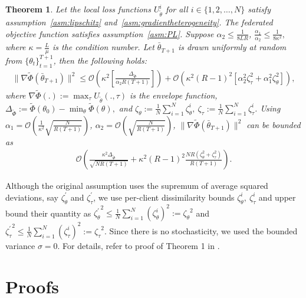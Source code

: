 \documentclass{article}
\let\cite\relax
\newcommand*{\cite}{\citep}
\def\gO{{\mathcal{O}}}
\newtheorem{theorem}{Theorem}%
\theoremstyle{definition}
\begin{document}
\begin{theorem}
    Let the local loss functions $U_{\tilde\theta}^i$ for all $i\in\{1,2,\dots,N\}$ satisfy assumption~\ref{asm:lipschitz} and~\ref{asm:gradientheterogeneity}. The federated objective function satisfies assumption~\ref{asm:PL}. Suppose $\alpha_2\leq \frac{1}{8LR}$, $\frac{\alpha_1}{\alpha_2}\leq\frac{1}{8\kappa^2},$ where $\kappa=\frac{L}{\mu}$ is the condition number. Let $\bar{\theta}_{T+1}$ is drawn uniformly at random from $\{\theta_t\}_{t=1}^{T+1}$, then the following holds:
    \begin{align*}
        \|\nabla\tilde\Phi(\bar\theta_{T+1})\|^2\leq \gO\left(\kappa^2\left[\frac{\Delta_{\tilde\Phi}}{\alpha_2R(T+1)}\right]\right)+\mathcal{O}\left(\kappa^2(R-1)^2[\alpha_2^2\zeta_\tau^2+\alpha_1^2\zeta_{\theta}^2]\right),
    \end{align*}
    where $\nabla\tilde\Phi(.):=\max_{\tau}U_{\tilde\theta}(.,\tau)$ is the envelope function, $\Delta_{\tilde\Phi}:=\tilde\Phi(\theta_0)-\min_{\theta}\tilde\Phi(\theta),$ and $\zeta_{\theta}:=\frac{1}{N}\sum_{i=1}^{N}\zeta_{\theta}^i,~\zeta_{\tau}:=\frac{1}{N}\sum_{i=1}^{N}\zeta_{\tau}^i$. Using $\alpha_1=\mathcal{O}\left(\frac{1}{\kappa^2}\sqrt{\frac{N}{R(T+1)}}\right)$, $\alpha_2=\mathcal{O}\left(\sqrt{\frac{N}{R(T+1)}}\right)$, $\|\nabla\tilde\Phi(\bar\theta_{T+1})\|^2$ can be bounded as
    \begin{align*}
        \mathcal{O}\left(\frac{\kappa^2\Delta_{\tilde\Phi}}{\sqrt{NR(T+1)}}+\kappa^2(R-1)^2\frac{NR(\zeta_{\theta}^2+\zeta_{\tau}^2)}{R(T+1)}\right).
    \end{align*}
\end{theorem}

Although the original assumption uses the supremum of average squared deviations, say $\zeta_{\theta}^\prime$ and $\zeta_{\tau}^\prime$, we use per-client dissimilarity bounds $ \zeta_\theta^i,~\zeta_\tau^i$ and upper bound their quantity as $ {\zeta_{\theta}^\prime}^2\leq \frac{1}{N} \sum_{i=1}^N (\zeta_\theta^i)^2:= {\zeta_\theta}^2$ and ${\zeta_{\tau}^\prime}^2 \leq \frac{1}{N} \sum_{i=1}^N (\zeta_\tau^i)^2:= {\zeta_\tau}^2$. Since there is no stochasticity, we used the bounded variance $\sigma=0$. For details, refer to proof of Theorem 1 in \cite{sharma2022federated}.

\section{Proofs}
\label{ap:proofs}
\end{document}
